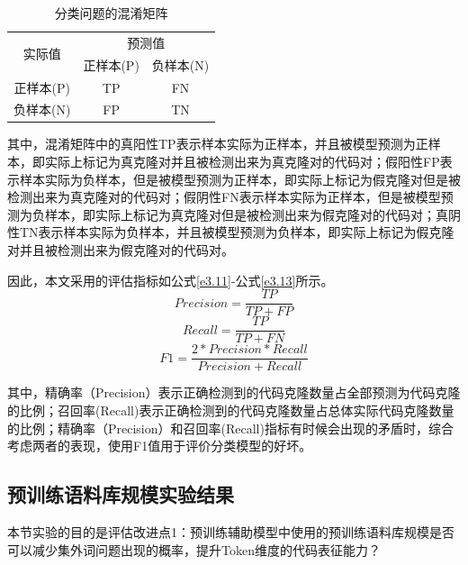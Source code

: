 \begin{table}[htp]
  \centering
  \caption{分类问题的混淆矩阵} 
  \label{tab:ConfusionMatrix}
  \renewcommand{\arraystretch}{1.1}
  \begin{tabular*}{0.7\textwidth}{@{\extracolsep{\fill}}ccc}
  \toprule
  \multirow{2}{*}{实际值} & \multicolumn{2}{c}{预测值} \\
  \cmidrule{2-3} 
  \multirow{2}{*}{} & 正样本(P) & 负样本(N) \\
  \midrule
    正样本(P)			&TP	  &FN		 \\
    负样本(N)			&FP		&TN		 \\
  \bottomrule
  \end{tabular*}
\end{table}

其中，混淆矩阵中的真阳性TP表示样本实际为正样本，并且被模型预测为正样本，即实际上标记为真克隆对并且被检测出来为真克隆对的代码对；假阳性FP表示样本实际为负样本，但是被模型预测为正样本，即实际上标记为假克隆对但是被检测出来为真克隆对的代码对；假阴性FN表示样本实际为正样本，但是被模型预测为负样本，即实际上标记为真克隆对但是被检测出来为假克隆对的代码对；真阴性TN表示样本实际为负样本，并且被模型预测为负样本，即实际上标记为假克隆对并且被检测出来为假克隆对的代码对。

因此，本文采用的评估指标如公式\ref{e3.11}-公式\ref{e3.13}所示。
\begin{equation}\label{e3.11}
  Precision = \frac{TP}{TP+FP} 
\end{equation}
\begin{equation}\label{e3.12}
  Recall = \frac{TP}{TP+FN} 
\end{equation}
\begin{equation}\label{e3.13}
  F1 = \frac{2*Precision*Recall}{Precision+Recall} 
\end{equation}

其中，精确率（Precision）表示正确检测到的代码克隆数量占全部预测为代码克隆的比例；召回率(Recall)表示正确检测到的代码克隆数量占总体实际代码克隆数量的比例；精确率（Precision）和召回率(Recall)指标有时候会出现的矛盾时，综合考虑两者的表现，使用F1值用于评价分类模型的好坏。

\subsection{预训练语料库规模实验结果}
\label{subsec:TokenResult1}

本节实验的目的是评估改进点1：预训练辅助模型中使用的预训练语料库规模是否可以减少集外词问题出现的概率，提升Token维度的代码表征能力？

